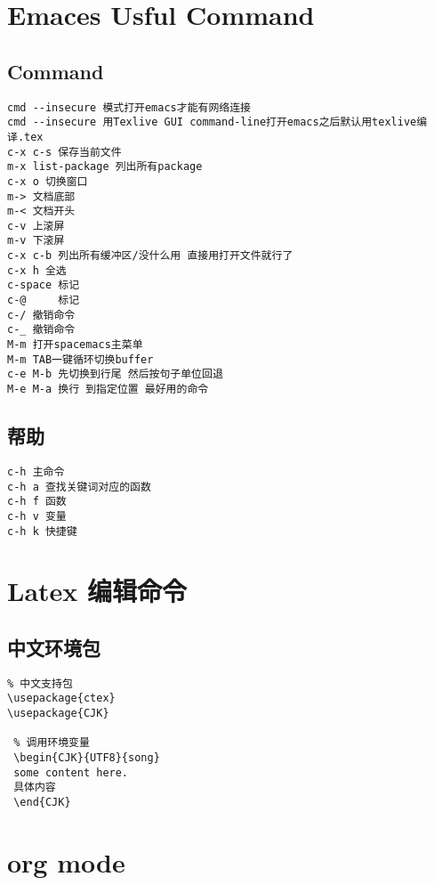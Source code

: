 \documentclass[11pt]{article}
\date{\today}
\title{}
\begin{document}
\tableofcontents

\section{Emaces Usful Command}
\label{sec:orgdddd02a}
\subsection{Command}
\label{sec:org58a34ee}
\begin{verbatim}
cmd --insecure 模式打开emacs才能有网络连接
cmd --insecure 用Texlive GUI command-line打开emacs之后默认用texlive编译.tex
c-x c-s 保存当前文件
m-x list-package 列出所有package
c-x o 切换窗口
m-> 文档底部
m-< 文档开头
c-v 上滚屏
m-v 下滚屏
c-x c-b 列出所有缓冲区/没什么用 直接用打开文件就行了
c-x h 全选
c-space 标记
c-@     标记
c-/ 撤销命令
c-_ 撤销命令
M-m 打开spacemacs主菜单
M-m TAB一键循环切换buffer
c-e M-b 先切换到行尾 然后按句子单位回退
M-e M-a 换行 到指定位置 最好用的命令
\end{verbatim}
\subsection{帮助}
\label{sec:org0d824e6}
\begin{verbatim}
c-h 主命令
c-h a 查找关键词对应的函数
c-h f 函数
c-h v 变量
c-h k 快捷键
\end{verbatim}
\section{Latex 编辑命令}
\label{sec:orgf2a7e1f}
\subsection{中文环境包}
\label{sec:orgd34735a}
\begin{verbatim}
% 中文支持包
\usepackage{ctex}
\usepackage{CJK}

 % 调用环境变量 
 \begin{CJK}{UTF8}{song}
 some content here.
 具体内容
 \end{CJK}
\end{verbatim}
\section{org mode}
\label{sec:orgd1d7b30}
\end{document}
